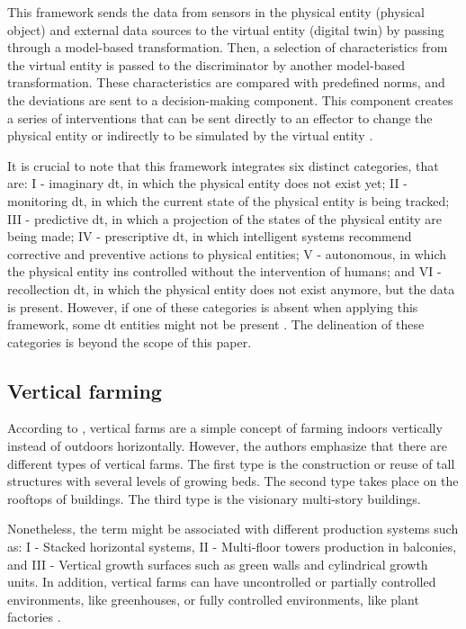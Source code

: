 \documentclass[preprint, review, 12pt]{elsarticle}
\begin{document}
This framework sends the data from sensors in the physical entity (physical object) and external data sources to the virtual entity (digital twin) by passing through a model-based transformation. Then, a selection of characteristics from the virtual entity is passed to the discriminator by another model-based transformation. These characteristics are compared with predefined norms, and the deviations are sent to a decision-making component. This component creates a series of interventions that can be sent directly to an effector to change the physical entity or indirectly to be simulated by the virtual entity \cite{verdouw2021}. 

It is crucial to note that this framework integrates six distinct categories, that are: I - imaginary \gls{dt}, in which the physical entity does not exist yet; II - monitoring \gls{dt}, in which the current state of the physical entity is being tracked; III - predictive \gls{dt}, in which a projection of the states of the physical entity are being made; IV - prescriptive \gls{dt}, in which intelligent systems recommend corrective and preventive actions to physical entities; V - autonomous, in which the physical entity ins controlled without the intervention of humans; and VI - recollection \gls{dt}, in which the physical entity does not exist anymore, but the data is present. However, if one of these categories is absent when applying this framework, some \gls{dt} entities might not be present \cite{verdouw2021}. The delineation of these categories is beyond the scope of this paper.

\subsection{Vertical farming}

According to \cite{al-kodmany2018}, vertical farms are a simple concept of farming indoors vertically instead of outdoors horizontally. However, the authors emphasize that there are different types of vertical farms. The first type is the construction or reuse of tall structures with several levels of growing beds. The second type takes place on the rooftops of buildings. The third type is the visionary multi-story buildings. 

Nonetheless, the term might be associated with different production systems \cite{beacham2019} such as: I - Stacked horizontal systems, II - Multi-floor towers production in balconies, and III - Vertical growth surfaces such as green walls and cylindrical growth units. In addition, vertical farms can have uncontrolled or partially controlled environments, like greenhouses, or fully controlled environments, like plant factories \cite{kozai2020, benke2017a, raminshamshiri2018}. 
\end{document}
